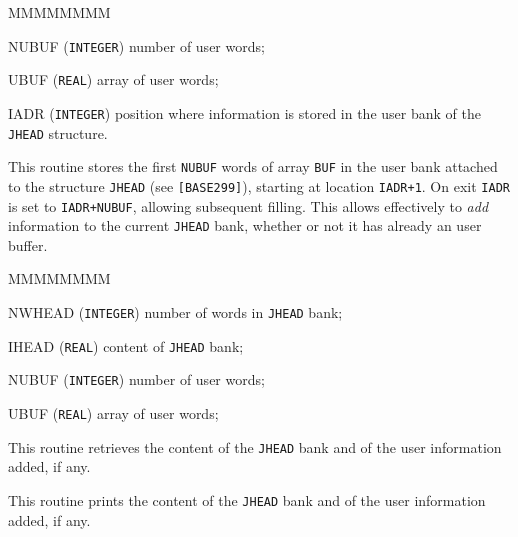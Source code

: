 \begin{DLtt}{MMMMMMMM}
\item[NUBUF] ({\tt INTEGER}) number of user words;
\item[UBUF] ({\tt REAL}) array of user words;
\item[IADR] ({\tt INTEGER}) position where information is stored in the
user bank of the {\tt JHEAD} structure.
\end{DLtt}

This routine stores the first {\tt NUBUF} words of array {\tt BUF} in the
user bank attached to the structure {\tt JHEAD} (see {\tt [BASE299]}),
starting at location {\tt IADR+1}.
On exit {\tt IADR} is set to {\tt IADR+NUBUF}, allowing subsequent filling. 
This allows effectively 
to {\it add} information to the current {\tt JHEAD} bank, whether or not it has 
already an user buffer.

\begin{DLtt}{MMMMMMMM}
\item[NWHEAD] ({\tt INTEGER}) number of words in {\tt JHEAD} bank;
\item[IHEAD] ({\tt REAL}) content of {\tt JHEAD} bank;
\item[NUBUF] ({\tt INTEGER}) number of user words;
\item[UBUF] ({\tt REAL}) array of user words;
\end{DLtt}

This routine retrieves the content of the {\tt JHEAD} bank and of the
user information added, if any.


This routine prints the content of the {\tt JHEAD} bank and of the
user information added, if any.

